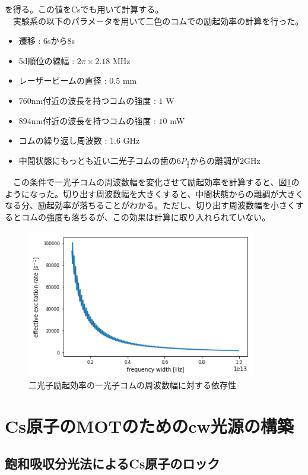 \documentclass[uplatex, dvipdfmx, a4paper, report, papersize, 11pt]{jsbook}
\begin{document}
を得る。この値をCsでも用いて計算する。\\
　実験系の以下のパラメータを用いて二色のコムでの励起効率の計算を行った。
\begin{itemize}
  \item 遷移 : 6sから8s
  \item 5d順位の線幅 : $2\pi \times 2.18$ MHz
  \item レーザービームの直径 : $0.5$ mm
  \item 760nm付近の波長を持つコムの強度 : $1$ W
  \item 894nm付近の波長を持つコムの強度 : $10$ mW
  \item コムの繰り返し周波数 : $1.6$ GHz
  \item 中間状態にもっとも近い二光子コムの歯の$6P_{\frac{3}{2}}$からの離調が$2 \mathrm{GHz}$
\end{itemize}
　この条件で一光子コムの周波数幅を変化させて励起効率を計算すると、図\ref{2color_excitation_rate}のようになった。切り出す周波数幅を大きくすると、中間状態からの離調が大きくなる分、励起効率が落ちることがわかる。ただし、切り出す周波数幅を小さくするとコムの強度も落ちるが、この効果は計算に取り入れられていない。

\begin{figure}[htbp]
 \begin{center}
  \includegraphics[width=100mm]{figures/chapter3/2color_excitation_rate_astro.png}
\end{center}
 \caption{二光子励起効率の一光子コムの周波数幅に対する依存性}
 \label{2color_excitation_rate}
\end{figure}

\chapter{Cs原子のMOTのためのcw光源の構築}
\section{飽和吸収分光法によるCs原子のロック}
\end{document}

